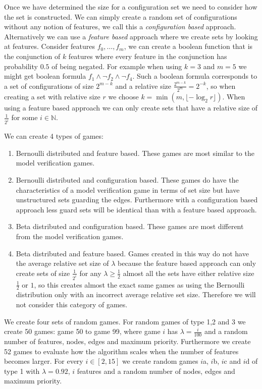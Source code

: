 Once we have determined the size for a configuration set we need to consider how the set is constructed. We can simply create a random set of configurations without any notion of features, we call this a \textit{configuration based} approach. Alternatively we can use a \textit{feature based} approach where we create sets by looking at features. Consider features $f_0, \dots, f_m$, we can create a boolean function that is the conjunction of $k$ features where every feature in the conjunction has probability $0.5$ of being negated.  For example when using $k=3$ and $m=5$ we might get boolean formula $f_1 \wedge \neg f_2 \wedge \neg f_4$. Such a boolean formula corresponds to a set of configurations of size $2^{m-k}$ and a relative size $\frac{2^{m-k}}{2^m} = 2^{-k}$, so when creating a set with relative size $r$ we choose $k = \min(m, \lfloor -\log_2{r} \rfloor)$. When using a feature based approach we can only create sets that have a relative size of $\frac{1}{2^i}$ for some $i \in \mathbb{N}$.

We can create 4 types of games:
\begin{enumerate}
	\item Bernoulli distributed and feature based. These games are most similar to the model verification games.
	\item Bernoulli distributed and configuration based. These games do have the characteristics of a model verification game in terms of set size but have unstructured sets guarding the edges. Furthermore with a configuration based approach less guard sets will be identical than with a feature based approach.
	\item Beta distributed and configuration based. These games are most different from the model verification games.
	\item Beta distributed and feature based. Games created in this way do not have the average relative set size of $\lambda$ because the feature based approach can only create sets of size $\frac{1}{2^i}$ for any $\lambda \geq \frac{1}{2}$ almost all the sets have either relative size $\frac{1}{2}$ or $1$, so  this creates almost the exact same games as using the Bernoulli distribution only with an incorrect average relative set size. Therefore we will not consider this category of games.
\end{enumerate}

We create four sets of random games. For random games of type 1,2 and 3 we create 50 games: game 50 to game 99, where game $i$ has $\lambda=\frac{i}{100}$ and a random number of features, nodes, edges and maximum priority. Furthermore we create 52 games to evaluate how the algorithm scales when the number of features becomes larger. For every $i \in [2,15]$ we create random games $i$a, $i$b, $i$c and $i$d of type 1 with $\lambda=0.92$, $i$ features and a random number of nodes, edges and maximum priority. 


